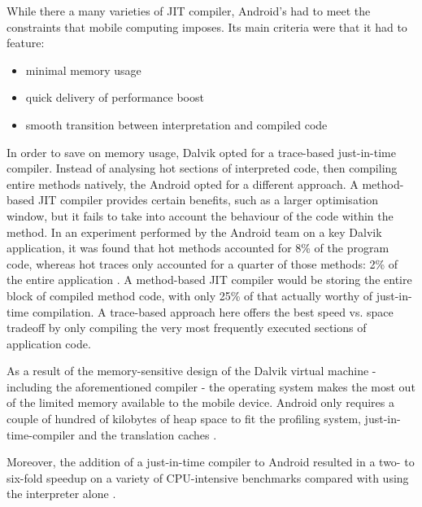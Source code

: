 While there a many varieties of JIT compiler, Android's had to meet the constraints that mobile computing imposes. Its main criteria were that it had to feature:

\begin{itemize}
    \item minimal memory usage
    \item quick delivery of performance boost
    \item smooth transition between interpretation and compiled code
\end{itemize}

In order to save on memory usage, Dalvik opted for a trace-based just-in-time compiler. Instead of analysing hot sections of interpreted code, then compiling entire methods natively, the Android opted for a different approach. A method-based JIT compiler provides certain benefits, such as a larger optimisation window, but it fails to take into account the behaviour of the code within the method. In an experiment performed by the Android team on a key Dalvik application, it was found that hot methods accounted for 8\% of the program code, whereas hot traces only accounted for a quarter of those methods: 2\% of the entire application \cite{android_22}. A method-based JIT compiler would be storing the entire block of compiled method code, with only 25\% of that actually worthy of just-in-time compilation. A trace-based approach here offers the best speed vs. space tradeoff by only compiling the very most frequently executed sections of application code.

As a result of the memory-sensitive design of the Dalvik virtual machine - including the aforementioned compiler - the operating system makes the most out of the limited memory available to the mobile device. Android only requires a couple of hundred of kilobytes of heap space to fit the profiling system, just-in-time-compiler and the translation caches \cite{android_22}.

Moreover, the addition of a just-in-time compiler to Android resulted in a two- to six-fold speedup on a variety of CPU-intensive benchmarks compared with using the interpreter alone \cite{android_22}.
